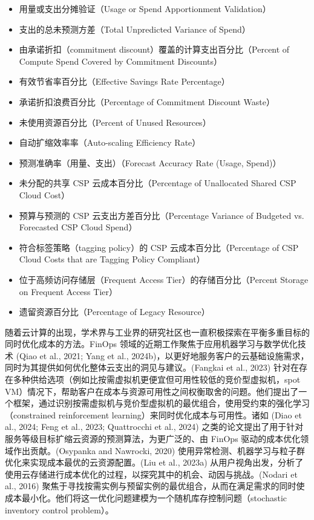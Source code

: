 \documentclass[10pt,UTF8,fontset=fandol]{ctexart}
\begin{document}
\begin{itemize}
\item 用量或支出分摊验证（Usage or Spend Apportionment Validation）
\item 支出的总未预测方差（Total Unpredicted Variance of Spend）
\item 由承诺折扣（commitment discount）覆盖的计算支出百分比（Percent of Compute Spend Covered by Commitment Discounts）
\item 有效节省率百分比（Effective Savings Rate Percentage）
\item 承诺折扣浪费百分比（Percentage of Commitment Discount Waste）
\item 未使用资源百分比（Percent of Unused Resources）
\item 自动扩缩效率率（Auto-scaling Efficiency Rate）
\item 预测准确率（用量、支出）（Forecast Accuracy Rate (Usage, Spend)）
\item 未分配的共享 CSP 云成本百分比（Percentage of Unallocated Shared CSP Cloud Cost）
\item 预算与预测的 CSP 云支出方差百分比（Percentage Variance of Budgeted vs. Forecasted CSP Cloud Spend）
\item 符合标签策略（tagging policy）的 CSP 云成本百分比（Percentage of CSP Cloud Costs that are Tagging Policy Compliant）
\item 位于高频访问存储层（Frequent Access Tier）的存储百分比（Percent Storage on Frequent Access Tier）
\item 遗留资源百分比（Percentage of Legacy Resource）
\end{itemize}

随着云计算的出现，学术界与工业界的研究社区也一直积极探索在平衡多重目标的同时优化成本的方法。FinOps 领域的近期工作聚焦于应用机器学习与数学优化技术 (Qiao et al., 2021; Yang et al., 2024b)，以更好地服务客户的云基础设施需求，同时为其提供如何优化整体云支出的洞见与建议。(Fangkai et al., 2023) 针对在存在多种供给选项（例如比按需虚拟机更便宜但可用性较低的竞价型虚拟机，spot VM）情况下，帮助客户在成本与资源可用性之间权衡取舍的问题。他们提出了一个框架，通过识别按需虚拟机与竞价型虚拟机的最优组合，使用受约束的强化学习（constrained reinforcement learning）来同时优化成本与可用性。诸如 (Diao et al., 2024; Feng et al., 2023; Quattrocchi et al., 2024) 之类的论文提出了用于针对服务等级目标扩缩云资源的预测算法，为更广泛的、由 FinOps 驱动的成本优化领域作出贡献。(Osypanka and Nawrocki, 2020) 使用异常检测、机器学习与粒子群优化来实现成本最优的云资源配置。(Liu et al., 2023a) 从用户视角出发，分析了使用云存储进行成本优化的过程，以探究其中的机会、动因与挑战。(Nodari et al., 2016) 聚焦于寻找按需实例与预留实例的最优组合，从而在满足需求的同时使成本最小化。他们将这一优化问题建模为一个随机库存控制问题（stochastic inventory control problem）。
\end{document}
